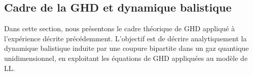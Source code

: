 \subsection{Cadre de la GHD et dynamique balistique}
\label{sec.GHDpredictions}\label{sec:ghd}\label{chap6:sec:ghd}



Dans cette section, nous présentons le cadre théorique de \gls{GHD} appliqué à l’expérience décrite précédemment. L’objectif est de décrire analytiquement la dynamique balistique induite par une coupure bipartite dans un gaz quantique unidimensionnel, en exploitant les équations de \gls{GHD} appliquées au modèle de \gls{LL}.\\




